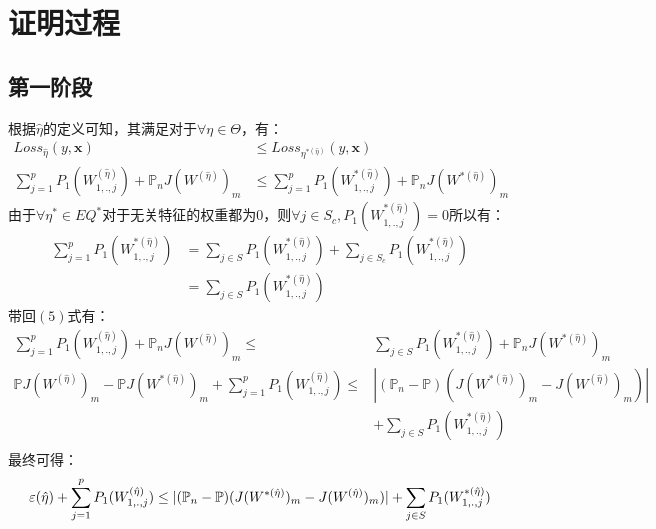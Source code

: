 \documentclass{article}
\begin{document}
\section{证明过程}
\subsection{第一阶段}
根据$\hat{\eta}$的定义可知，其满足对于$\forall \eta \in \Theta$，有：
\begin{equation}
	\begin{aligned}
		Loss_{\hat{\eta}}(y,\pmb{x})&\leq Loss_{\eta^{*(\hat{\eta})}}(y,\pmb{x})\\
		\sum_{j=1}^p P_1(W_{1,.,j}^{(\hat{\eta})})+\mathbb{P}_nJ(W^{(\hat{\eta})})_m&\leq\sum_{j=1}^p P_1(W_{1,.,j}^{*(\hat{\eta})})+\mathbb{P}_nJ(W^{*(\hat{\eta})})_m
	\end{aligned}
\end{equation}
由于$\forall \eta^* \in EQ^*$对于无关特征的权重都为$0$，则$\forall j\in S_c,P_1(W_{1,.,j}^{*(\hat{\eta})})=0$所以有：
\begin{equation}
	\begin{aligned}
		\sum_{j=1}^p P_1(W_{1,.,j}^{*(\hat{\eta})})&=\sum_{j\in S} P_1(W_{1,.,j}^{*(\hat{\eta})})+\sum_{j\in S_c} P_1(W_{1,.,j}^{*(\hat{\eta})})\\
		&=\sum_{j\in S} P_1(W_{1,.,j}^{*(\hat{\eta})})
	\end{aligned}
\end{equation}
带回$(5)$式有：
\begin{equation}
	\begin{aligned}
		\sum_{j=1}^p P_1(W_{1,.,j}^{(\hat{\eta})})+\mathbb{P}_nJ(W^{(\hat{\eta})})_m\leq&\sum_{j \in S} P_1(W_{1,.,j}^{*(\hat{\eta})})+\mathbb{P}_nJ(W^{*(\hat{\eta})})_m\\
		\mathbb{P}J(W^{(\hat{\eta})})_m-\mathbb{P}J(W^{*(\hat{\eta})})_m+\sum^p_{j=1}P_1(W_{1,.,j}^{(\hat{\eta})})\leq&|(\mathbb{P}_n-\mathbb{P})(J(W^{*(\hat{\eta})})_m-J(W^{(\hat{\eta})})_m)|\\&+\sum_{j\in S} P_1(W_{1,.,j}^{*(\hat{\eta})})\\
	\end{aligned}
\end{equation}
最终可得：
\begin{equation}\label{firstresult}
	\varepsilon(\hat{\eta})+\sum^p_{j=1}P_1(W_{1,.,j}^{(\hat{\eta})})\leq|(\mathbb{P}_n-\mathbb{P})(J(W^{*(\hat{\eta})})_m-J(W^{(\hat{\eta})})_m)|+\sum_{j\in S} P_1(W_{1,.,j}^{*(\hat{\eta})})\\
\end{equation}
\end{document}
